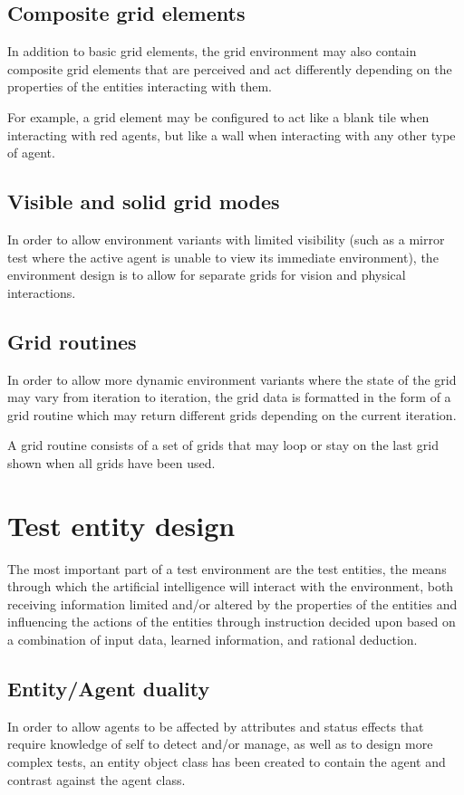 \documentclass[masterthesis]{fer}
\begin{document}
\subsection{Composite grid elements}
In addition to basic grid elements, the grid environment may also contain composite grid elements that are perceived and act differently depending on the properties of the entities interacting with them.

For example, a grid element may be configured to act like a blank tile when interacting with red agents, but like a wall when interacting with any other type of agent.

\subsection{Visible and solid grid modes}

In order to allow environment variants with limited visibility (such as a mirror test where the active agent is unable to view its immediate environment), the environment design is to allow for separate grids for vision and physical interactions.

\subsection{Grid routines}

In order to allow more dynamic environment variants where the state of the grid may vary from iteration to iteration, the grid data is formatted in the form of a grid routine which may return different grids depending on the current iteration.

A grid routine consists of a set of grids that may loop or stay on the last grid shown when all grids have been used. 

\section{Test entity design}

The most important part of a test environment are the test entities, the means through which the artificial intelligence will interact with the environment, both receiving information limited and/or altered by the properties of the entities and influencing the actions of the entities through instruction decided upon based on a combination of input data, learned information, and rational deduction.

\subsection{Entity/Agent duality}
In order to allow agents to be affected by attributes and status effects that require knowledge of self to detect and/or manage, as well as to design more complex tests, an entity object class has been created to contain the agent and contrast against the agent class.
\end{document}
